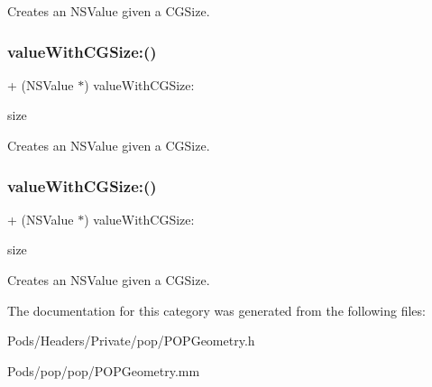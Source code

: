 Creates an N\+S\+Value given a C\+G\+Size. \mbox{\label{category_n_s_value_07_p_o_p_08_a81be674dbdd3742aa6ba2bca882219c4}} 
\subsubsection{\texorpdfstring{value\+With\+C\+G\+Size\+:()}{valueWithCGSize:()}\hspace{0.1cm}{\footnotesize\ttfamily [2/3]}}
{\footnotesize\ttfamily + (N\+S\+Value $\ast$) value\+With\+C\+G\+Size\+: \begin{DoxyParamCaption}\item[{(C\+G\+Size)}]{size }\end{DoxyParamCaption}}

Creates an N\+S\+Value given a C\+G\+Size. \mbox{\label{category_n_s_value_07_p_o_p_08_a81be674dbdd3742aa6ba2bca882219c4}} 
\subsubsection{\texorpdfstring{value\+With\+C\+G\+Size\+:()}{valueWithCGSize:()}\hspace{0.1cm}{\footnotesize\ttfamily [3/3]}}
{\footnotesize\ttfamily + (N\+S\+Value $\ast$) value\+With\+C\+G\+Size\+: \begin{DoxyParamCaption}\item[{(C\+G\+Size)}]{size }\end{DoxyParamCaption}}

Creates an N\+S\+Value given a C\+G\+Size. 

The documentation for this category was generated from the following files\+:\begin{DoxyCompactItemize}
\item 
Pods/\+Headers/\+Private/pop/P\+O\+P\+Geometry.\+h\item 
Pods/pop/pop/P\+O\+P\+Geometry.\+mm\end{DoxyCompactItemize}
